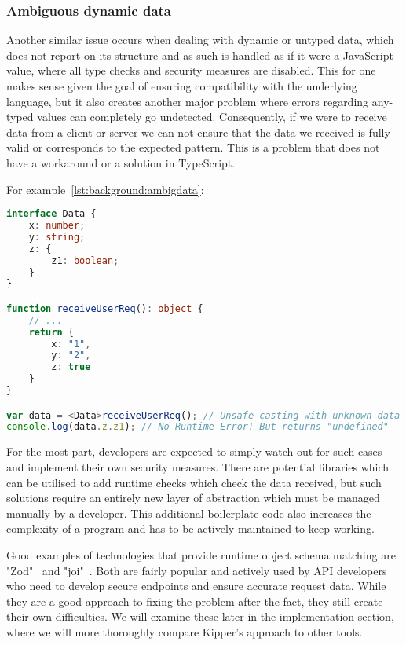\subsubsection{Ambiguous dynamic data}

Another similar issue occurs when dealing with dynamic or untyped data, which does not report on its structure and as such is handled as if it were a JavaScript value, where all type checks and security measures are disabled. This for one makes sense given the goal of ensuring compatibility with the underlying language, but it also creates another major problem where errors regarding any-typed values can completely go undetected. Consequently, if we were to receive data from a client or server we can not ensure that the data we received is fully valid or corresponds to the expected pattern. This is a problem that does not have a workaround or a solution in TypeScript.

For example~\ref{lst:background:ambigdata}:

\begin{lstlisting}[language=TypeScript,caption=Ambiguous dynamic data in TypeScript,label=lst:background:ambigdata]
interface Data {
	x: number;
	y: string;
	z: {
		z1: boolean;
	}
}

function receiveUserReq(): object {
	// ...
	return {
		x: "1",
		y: "2",
		z: true
	}
}

var data = <Data>receiveUserReq(); // Unsafe casting with unknown data
console.log(data.z.z1); // No Runtime Error! But returns "undefined"
\end{lstlisting}

For the most part, developers are expected to simply watch out for such cases and implement their own security measures. There are potential libraries which can be utilised to add runtime checks which check the data received, but such solutions require an entirely new layer of abstraction which must be managed manually by a developer. This additional boilerplate code also increases the complexity of a program and has to be actively maintained to keep working. 

Good examples of technologies that provide runtime object schema matching are "Zod"~\cite{zod} and "joi"~\cite{joi}. Both are fairly popular and actively used by API developers who need to develop secure endpoints and ensure accurate request data. While they are a good approach to fixing the problem after the fact, they still create their own difficulties. We will examine these later in the implementation section, where we will more thoroughly compare Kipper's approach to other tools.

